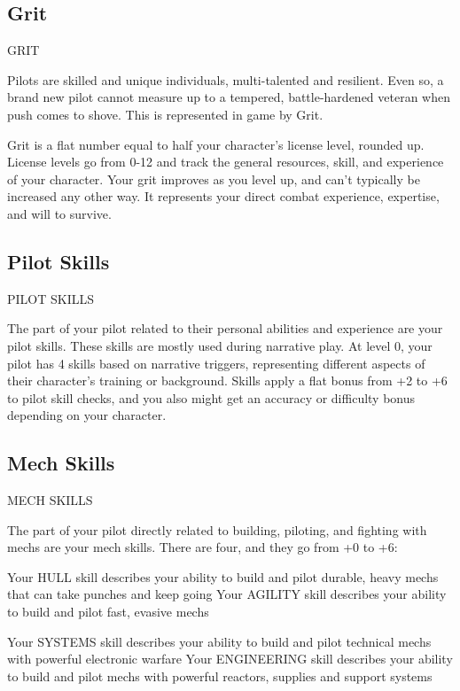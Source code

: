 \subsection{Grit}
                                                      GRIT  

Pilots are skilled and unique individuals, multi-talented and resilient. Even so, a brand new pilot  
cannot measure up to a tempered, battle-hardened veteran when push comes to shove. This is  
represented in game by Grit.  

Grit is a flat number equal to half your character’s license level, rounded up. License levels go  
from 0-12 and track the general resources, skill, and experience of your character. Your grit  
improves as you level up, and can’t typically be increased any other way. It represents your direct  
combat experience, expertise, and will to survive.  

\subsection{Pilot Skills}
                                              PILOT SKILLS  

The part of your pilot related to their personal abilities and experience are your pilot skills. These  
skills are mostly used during narrative play. At level 0, your pilot has 4 skills based on narrative  
triggers, representing different aspects of their character’s training or background. Skills apply a  
flat bonus from +2 to +6 to pilot skill checks, and you also might get an accuracy or difficulty  
bonus depending on your character.
 
\subsection{Mech Skills}
                                              MECH SKILLS  

The part of your pilot directly related to building, piloting, and fighting with mechs are your mech  
skills. There are four, and they go from +0 to +6:  

Your HULL skill describes your ability to build and pilot durable, heavy mechs that can take  
punches and keep going  
Your AGILITY skill describes your ability to build and pilot fast, evasive mechs  

                                                                                                                 


Your SYSTEMS skill describes your ability to build and pilot technical mechs with powerful  
electronic warfare  
Your ENGINEERING skill describes your ability to build and pilot mechs with powerful reactors,  
supplies and support systems  

